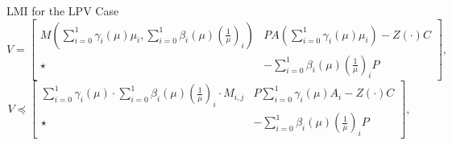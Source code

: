\begin{slide}{LMI for the LPV Case}
  \begin{equation}
    V = \begin{bmatrix}
      M(\sum_{i=0}^{1}\gamma_{i}(\mu)\mu_{i},\sum_{i=0}^{1}\beta_{i}(\mu)(\frac{1}{\mu})_{i}) & PA(\sum_{i=0}^{1}\gamma_{i}(\mu)\mu_{i}) - Z(\cdot)C \\
      \star                                                                                   & -\sum_{i=0}^{1}\beta_{i}(\mu)(\frac{1}{\mu})_{i}P
    \end{bmatrix},
  \end{equation}
  \begin{equation}
    V \preceq \begin{bmatrix}
      \sum_{i=0}^{1}\gamma_{i}(\mu)\cdot\sum_{i=0}^{1}\beta_{i}(\mu)(\frac{1}{\mu})_{i}\cdot{}M_{i,j} & P\sum_{i=0}^{1}\gamma_{i}(\mu)A_{i} - Z(\cdot)C   \\
      \star                                                                                           & -\sum_{i=0}^{1}\beta_{i}(\mu)(\frac{1}{\mu})_{i}P
    \end{bmatrix},
  \end{equation}
\end{slide}

